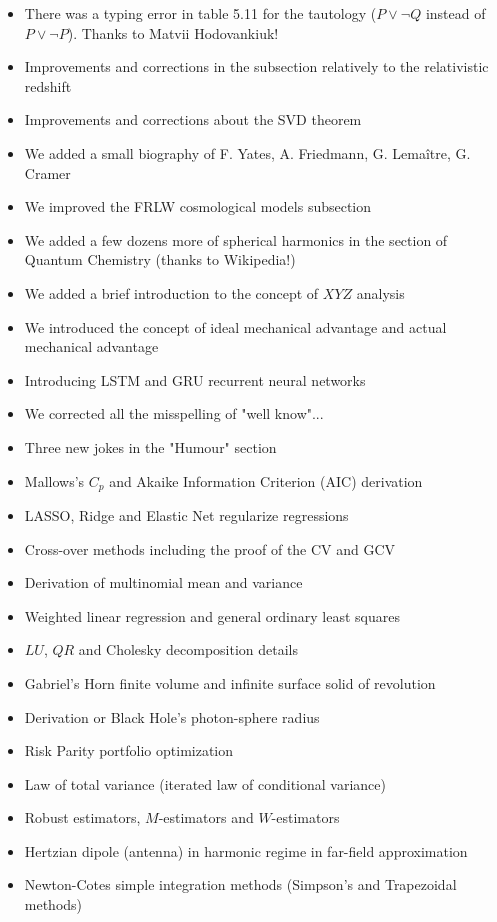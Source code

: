 \begin{itemize}
\begin{itemize}[noitemsep]
			\item There was a typing error in table 5.11 for the tautology ($P \vee \neg Q$ instead of $P \vee \neg P$). Thanks to Matvii Hodovankiuk!
			\item Improvements and corrections in the subsection relatively to the relativistic redshift
			\item Improvements and corrections about the SVD theorem
			\item We added a small biography of F. Yates, A. Friedmann, G. Lemaître, G. Cramer
			\item We improved the FRLW cosmological models subsection
			\item We added a few dozens more of spherical harmonics in the section of Quantum Chemistry (thanks to Wikipedia!)
			\item We added a brief introduction to the concept of $XYZ$ analysis
			\item We introduced the concept of ideal mechanical advantage and actual mechanical advantage
			\item Introducing LSTM and GRU recurrent neural networks
			\item We corrected all the misspelling of "well know"...
			\item Three new jokes in the "Humour" section
			\item Mallows's $C_p$ and Akaike Information Criterion (AIC) derivation
			\item LASSO, Ridge and Elastic Net regularize regressions
			\item Cross-over methods including the proof of the CV and GCV
			\item Derivation of multinomial mean and variance
			\item Weighted linear regression and general ordinary least squares
			\item $LU$, $QR$ and Cholesky decomposition details
			\item Gabriel's Horn finite volume and infinite surface solid of revolution
			\item Derivation or Black Hole's photon-sphere radius
			\item Risk Parity portfolio optimization
			\item Law of total variance (iterated law of conditional variance)
			\item Robust estimators, $M$-estimators and $W$-estimators
			\item Hertzian dipole (antenna) in harmonic regime in far-field approximation
			\item Newton-Cotes simple integration methods (Simpson's and Trapezoidal methods)

\end{itemize}
\end{itemize}
